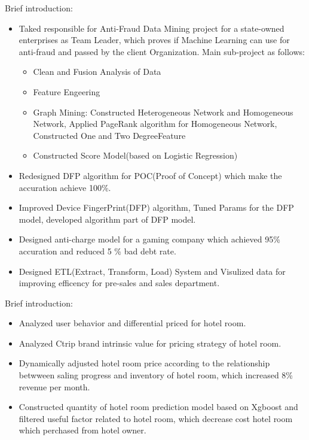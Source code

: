 \documentclass{resume}
\begin{document}
Brief introduction: 
\begin{itemize}
   \item Taked responsible for Anti-Fraud Data Mining project for a state-owned enterprises as Team Leader, which proves if Machine Learning can use for anti-fraud and passed by the client Organization. Main sub-project as follows:
   \begin{itemize}
       \item Clean and Fusion Analysis of Data
       \item Feature Engeering
       \item Graph Mining: Constructed Heterogeneous Network and Homogeneous Network, Applied PageRank algorithm for Homogeneous Network, Constructed One and Two DegreeFeature 
       \item Constructed Score Model(based on Logistic Regression)
   \end{itemize}
   \item Redesigned DFP algorithm for POC(Proof of Concept) which make the accuration achieve 100\%.
   \item Improved Device FingerPrint(DFP) algorithm, Tuned Params for the DFP model, developed algorithm part of DFP model.
   \item Designed anti-charge model for a gaming company which achieved 95\% accuration and reduced 5 \% bad debt rate.
   \item Designed ETL(Extract, Transform, Load) System and Visulized data for improving efficency for pre-sales and sales department. 
\end{itemize}

Brief introduction:
\begin{itemize}
  \item Analyzed user behavior and differential priced for hotel room.
  \item Analyzed Ctrip brand intrinsic value for pricing strategy of hotel room.
  \item Dynamically adjusted hotel room price according to the relationship betwween saling progress and inventory of hotel room, which increased 8\% revenue per month.
  \item Constructed quantity of hotel room prediction model based on Xgboost and filtered useful factor related to hotel room, which decrease cost hotel room which perchased from hotel owner.
\end{itemize}
\end{document}
